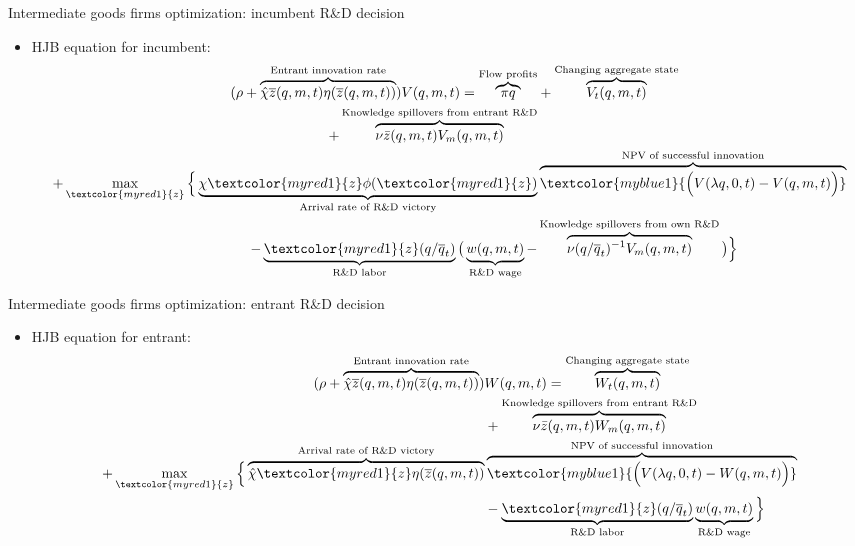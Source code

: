 \documentclass[english,usenames,dvipsnames]{beamer}
\begin{document}
\begin{frame}{Intermediate goods firms optimization: incumbent R\&D decision}
\begin{itemize}
	\item HJB equation for incumbent:
	\footnotesize
	\begin{align*}
	(\rho + \overbrace{\hat{\chi} \overline{z}(q,m,t)\eta(\overline{z}(q,m,t))}^{\text{Entrant innovation rate}}) V(q,m,t) = \overbrace{\pi q}^{\text{Flow profits}} &+ \overbrace{V_t(q,m,t)}^{\text{Changing aggregate state}} \\ 
	 +  \overbrace{\nu \bar{z}(q,m,t) V_m(q,m,t)}^{\text{Knowledge spillovers from entrant R\&D}}  &\\
	 + \max_{\textcolor{myred1}{z}} \Big\{\underbrace{\chi \textcolor{myred1}{z}\phi(\textcolor{myred1}{z})}_{\text{Arrival rate of R\&D victory}} &\overbrace{\textcolor{myblue1}{\Big(V(\lambda q,0,t)-V(q,m,t)\Big)}}^{\text{NPV of successful innovation}} \\
	 -\underbrace{\textcolor{myred1}{z}(q/\overline{q}_t)}_{\text{R\&D labor}} \big(\underbrace{w(q,m,t)}_{\text{R\&D wage}} - & \overbrace{\nu (q/\overline{q}_t)^{-1} V_m(q,m,t)}^{\text{Knowledge spillovers from own R\&D}}\big)\Big \} 
	\end{align*}
\end{itemize}
\end{frame}

\begin{frame}{Intermediate goods firms optimization: entrant R\&D decision}
\begin{itemize}
	\item HJB equation for entrant: 
	\footnotesize
	\begin{align*}
	(\rho +  \overbrace{\hat{\chi} \overline{z}(q,m,t)\eta(\overline{z}(q,m,t))}^{\text{Entrant innovation rate}}) & W(q,m,t) = \overbrace{W_t(q,m,t)}^{\text{Changing aggregate state}} \\
	& + \overbrace{\nu \bar{z}(q,m,t) W_m(q,m,t)}^{\text{Knowledge spillovers from entrant R\&D}} \\
	 + \max_{\textcolor{myred1}{z}} \Big \{ \overbrace{\hat{\chi} {\textcolor{myred1}{z}} \eta(\overline{z}(q,m,t))}^{\text{Arrival rate of R\&D victory}} & \overbrace{\textcolor{myblue1}{\Big( V(\lambda q,0,t) - W(q,m,t) \Big)}}^{\text{NPV of successful innovation}} \\
	& - \underbrace{\textcolor{myred1}{z}(q/\overline{q}_t)}_{\text{R\&D labor}} \underbrace{w(q,m,t)}_{\text{R\&D wage}}  \Big\}
	\end{align*}
\end{itemize}
\end{frame}
\end{document}
